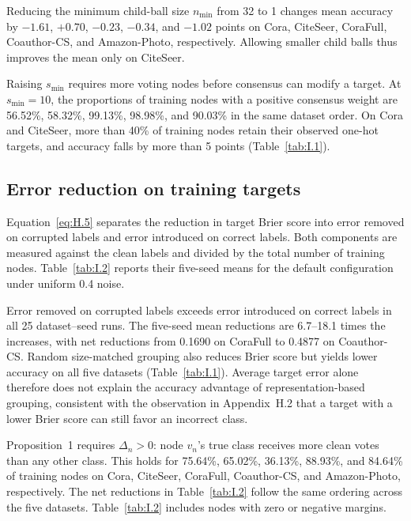 \documentclass[10pt,letterpaper,nopreprintline]{elsarticle}
\begin{document}
Reducing the minimum child-ball size \(n_{\min}\) from 32 to 1 changes mean accuracy by \(-1.61\), \(+0.70\), \(-0.23\), \(-0.34\), and \(-1.02\) points on Cora, CiteSeer, CoraFull, Coauthor-CS, and Amazon-Photo, respectively. Allowing smaller child balls thus improves the mean only on CiteSeer.

Raising \(s_{\min}\) requires more voting nodes before consensus can modify a target. At \(s_{\min}=10\), the proportions of training nodes with a positive consensus weight are 56.52\%, 58.32\%, 99.13\%, 98.98\%, and 90.03\% in the same dataset order. On Cora and CiteSeer, more than 40\% of training nodes retain their observed one-hot targets, and accuracy falls by more than 5 points (Table~\ref{tab:I.1}).

\subsection{Error reduction on training targets}\label{sec:I.2}

Equation~\eqref{eq:H.5} separates the reduction in target Brier score into error removed on corrupted labels and error introduced on correct labels. Both components are measured against the clean labels and divided by the total number of training nodes. Table~\ref{tab:I.2} reports their five-seed means for the default configuration under uniform 0.4 noise.



Error removed on corrupted labels exceeds error introduced on correct labels in all 25 dataset--seed runs. The five-seed mean reductions are 6.7--18.1 times the increases, with net reductions from 0.1690 on CoraFull to 0.4877 on Coauthor-CS. Random size-matched grouping also reduces Brier score but yields lower accuracy on all five datasets (Table~\ref{tab:I.1}). Average target error alone therefore does not explain the accuracy advantage of representation-based grouping, consistent with the observation in Appendix~H.2 that a target with a lower Brier score can still favor an incorrect class.

Proposition~1 requires \(\Delta_n>0\): node \(v_n\)'s true class receives more clean votes than any other class. This holds for 75.64\%, 65.02\%, 36.13\%, 88.93\%, and 84.64\% of training nodes on Cora, CiteSeer, CoraFull, Coauthor-CS, and Amazon-Photo, respectively. The net reductions in Table~\ref{tab:I.2} follow the same ordering across the five datasets. Table~\ref{tab:I.2} includes nodes with zero or negative margins.
\end{document}
